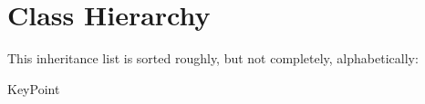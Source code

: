 \section{Class Hierarchy}
This inheritance list is sorted roughly, but not completely, alphabetically\+:\begin{DoxyCompactList}
\item {}
\item {}
\item {}
\item Key\+Point\begin{DoxyCompactList}
\item {}
\end{DoxyCompactList}
\end{DoxyCompactList}
